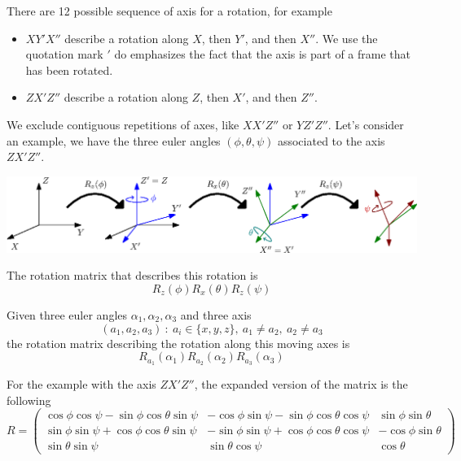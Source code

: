 \documentclass[10pt, letterpaper]{report}
\begin{document}
\noindent There are 12 possible sequence of axis for a rotation, for example\begin{itemize}
    \item $XY'X''$ describe a rotation along $X$, then $Y'$, and then $X''$. We use the quotation mark $'$ do emphasizes the fact that the axis is part of a frame that has been rotated.
    \item $ZX'Z''$ describe a rotation along $Z$, then $X'$, and then $Z''$.
\end{itemize}
We exclude  contiguous repetitions of axes, like $XX'Z''$ or $YZ'Z''$. Let's consider an example, we have the three euler angles $(\phi,\theta,\psi)$ associated to the axis $ZX'Z''$.
\begin{center}
    \includegraphics[width=\textwidth ]{images/eulerangles.eps}
\end{center}
The rotation matrix that describes this rotation is \begin{equation}
    R_z(\phi)R_{x}(\theta)R_z(\psi)
\end{equation}
\begin{definition}
    Given three euler angles $\alpha_1,\alpha_2,\alpha_3$ and three axis $$(a_1,a_2,a_3)  \ : \ a_i\in \{x,y,z\}, \ a_1\ne a_{2}, \ a_2\ne a_3
    $$
    the rotation matrix describing the rotation along this moving axes is\begin{equation}
        R_{a_1}(\alpha_1) R_{a_2}(\alpha_2) R_{a_3}(\alpha_3)
    \end{equation}
\end{definition}
For the example with the axis $ZX'Z''$, the expanded version of the matrix is the following\begin{equation}\label{ZXZ_mat}
    R=  \begin{pmatrix}
        \cos\phi\cos\psi-\sin\phi\cos\theta\sin\psi&-\cos\phi\sin\psi-\sin\phi\cos\theta\cos\psi&\sin\phi\sin\theta\\ 
        \sin\phi\sin\psi+\cos\phi\cos\theta\sin\psi&-\sin\phi\sin\psi+\cos\phi\cos\theta\cos\psi&-\cos\phi\sin\theta\\ 
        \sin\theta\sin\psi&\sin\theta\cos\psi&\cos\theta
    \end{pmatrix}
\end{equation}
\end{document}

